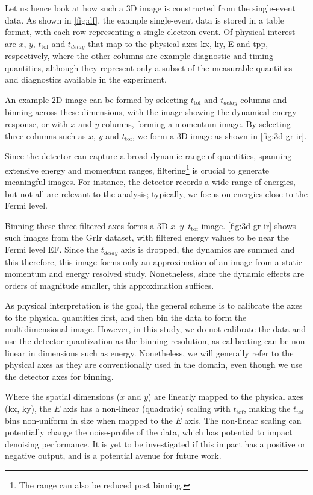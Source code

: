 Let us hence look at how such a 3D image is constructed from the single-event data. As shown in \cref{fig:df}, the example single-event data is stored in a table format, with each row representing a single electron-event. Of physical interest are $x$, $y$, $t_{\text{tof}}$ and $t_{delay}$ that map to the physical axes \gls{kx}, \gls{ky}, \gls{E} and \gls{tpp}, respectively, where the other columns are example diagnostic and timing quantities, although they represent only a subset of the measurable quantities and diagnostics available in the experiment.

An example 2D image can be formed by selecting $t_{\text{tof}}$ and $t_{delay}$ columns and binning across these dimensions, with the image showing the dynamical energy response, or with $x$ and $y$ columns, forming a momentum image. By selecting three columns such as $x$, $y$ and $t_{\text{tof}}$, we form a 3D image as shown in \cref{fig:3d-gr-ir}.

Since the detector can capture a broad dynamic range of quantities, spanning extensive energy and momentum ranges, filtering\footnote{The range can also be reduced post binning.} is crucial to generate meaningful images. For instance, the detector records a wide range of energies, but not all are relevant to the analysis; typically, we focus on energies close to the Fermi level. 

Binning these three filtered axes forms a 3D $x$--$y$--$t_{\text{tof}}$ image. \cref{fig:3d-gr-ir} shows such images from the \gls{GrIr} dataset, with filtered energy values to be near the Fermi level \gls{EF}. Since the $t_{delay}$ axis is dropped, the dynamics are summed and this therefore, this image forms only an approximation of an image from a static momentum and energy resolved study. Nonetheless, since the dynamic effects are orders of magnitude smaller, this approximation suffices.

As physical interpretation is the goal, the general scheme is to calibrate the axes to the physical quantities first, and then bin the data to form the multidimensional image. However, in this study, we do not calibrate the data and use the detector quantization as the binning resolution, as calibrating can be non-linear in dimensions such as energy. Nonetheless, we will generally refer to the physical axes as they are conventionally used in the domain, even though we use the detector axes for binning.

Where the spatial dimensions ($x$ and $y$) are linearly mapped to the physical axes (\gls{kx}, \gls{ky}), the $E$ axis has a non-linear (quadratic) scaling with $t_{\text{tof}}$, making the $t_{\text{tof}}$ bins non-uniform in size when mapped to the $E$ axis. The non-linear scaling can potentially change the noise-profile of the data, which has potential to impact denoising performance. It is yet to be investigated if this impact has a positive or negative output, and is a potential avenue for future work.

